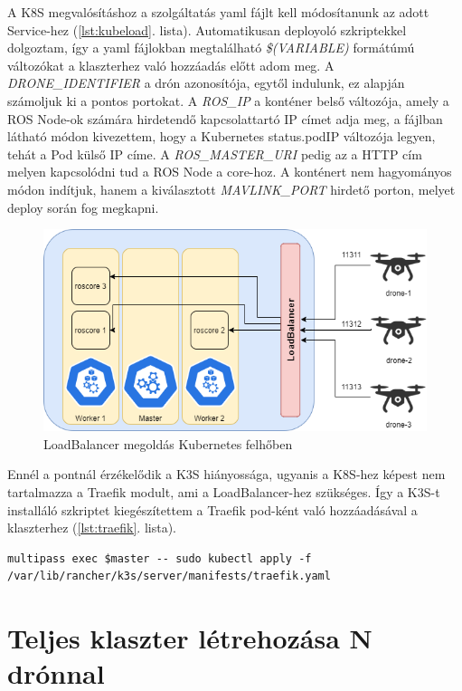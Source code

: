 \noindent
A K8S megvalósításhoz a szolgáltatás yaml fájlt kell módosítanunk az adott Service-hez (\ref{lst:kubeload}. lista). Automatikusan deployoló szkriptekkel dolgoztam, így a yaml fájlokban megtalálható \emph{\$(VARIABLE)} formátúmú változókat a klaszterhez való hozzáadás előtt adom meg. A \emph{DRONE\_IDENTIFIER} a drón azonosítója, egytől indulunk, ez alapján számoljuk ki a pontos portokat. A \emph{ROS\_IP} a konténer belső változója, amely a ROS Node-ok számára hirdetendő kapcsolattartó IP címet adja meg, a fájlban látható módon kivezettem, hogy a Kubernetes status.podIP változója legyen, tehát a Pod külső IP címe. A \emph{ROS\_MASTER\_URI} pedig az a HTTP cím melyen kapcsolódni tud a ROS Node a core-hoz. A konténert nem hagyományos módon indítjuk, hanem a kiválasztott \emph{MAVLINK\_PORT} hirdető porton, melyet deploy során fog megkapni. \\

\begin{figure}
	\centering
	\includegraphics[width=\linewidth]{figures/loadBalancer.png}
	\caption{LoadBalancer megoldás Kubernetes felhőben}
	\label{fig:loadbalancer}
\end{figure}

\noindent
Ennél a pontnál érzékelődik a K3S hiányossága, ugyanis a K8S-hez képest nem tartalmazza a Traefik modult, ami a LoadBalancer-hez szükséges. Így a K3S-t installáló szkriptet kiegészítettem a Traefik pod-ként való hozzáadásával a klaszterhez (\ref{lst:traefik}. lista).

\begin{lstlisting}[caption={Traefik hozzáadása a klaszterhez}, label={lst:traefik}]
multipass exec $master -- sudo kubectl apply -f /var/lib/rancher/k3s/server/manifests/traefik.yaml
\end{lstlisting}

\section{Teljes klaszter létrehozása N drónnal}

